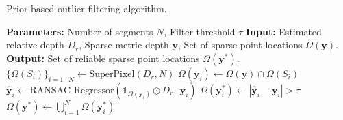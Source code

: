 \begin{algorithm}[t]
\caption{Prior-based outlier filtering algorithm.}
\label{algorithm:1}
\begin{algorithmic}[1]
\setlength{\itemsep}{0.15em}
    \State \textbf{Parameters:} Number of segments $N$, Filter threshold $\tau$
    \State \textbf{Input:} 
    Estimated relative depth $D_r$, Sparse metric depth $\mathbf{y}$, Set of sparse point locations $\Omega(\mathbf{y})$.
    \State \textbf{Output:} Set of reliable sparse point locations $\Omega(\mathbf{y}^*)$.
    \State $\{\Omega(S_i)\}_{i=1 \cdots N} \gets \text{SuperPixel}\left( D_r, N 
    \right)$ 
        \State $\Omega(\mathbf{y}_i) \gets \Omega(\mathbf{y}) \cap \Omega(S_i)$
        \State $\hat{\mathbf{y}}_i \gets %
        {\text{RANSAC~Regressor}}(\mathds{1}_{\Omega(\mathbf{y}_i)} \odot D_r,~ \mathbf{y}_i)$ 
        \State $\Omega(\mathbf{y}_i^{*}) \gets |\hat{\mathbf{y}}_i-\mathbf{y}_i| > \tau$
    \EndFor
    \State \( \Omega(\mathbf{y}^*) \gets \bigcup_{i=1}^{N} \Omega(\mathbf{y}_i^{*}) \)
\end{algorithmic}
\end{algorithm}
